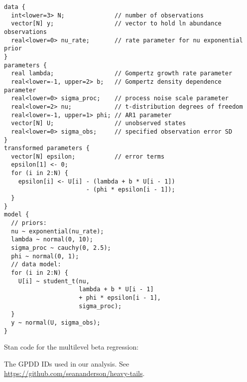 \begin{spacing}{1.15}
\begin{footnotesize}
\begin{verbatim}
data {
  int<lower=3> N;              // number of observations
  vector[N] y;                 // vector to hold ln abundance observations
  real<lower=0> nu_rate;       // rate parameter for nu exponential prior
}
parameters {
  real lambda;                 // Gompertz growth rate parameter
  real<lower=-1, upper=2> b;   // Gompertz density dependence parameter
  real<lower=0> sigma_proc;    // process noise scale parameter
  real<lower=2> nu;            // t-distribution degrees of freedom
  real<lower=-1, upper=1> phi; // AR1 parameter
  vector[N] U;                 // unobserved states
  real<lower=0> sigma_obs;     // specified observation error SD
}
transformed parameters {
  vector[N] epsilon;           // error terms
  epsilon[1] <- 0;
  for (i in 2:N) {
    epsilon[i] <- U[i] - (lambda + b * U[i - 1])
                       - (phi * epsilon[i - 1]);
  }
}
model {
  // priors:
  nu ~ exponential(nu_rate);
  lambda ~ normal(0, 10);
  sigma_proc ~ cauchy(0, 2.5);
  phi ~ normal(0, 1);
  // data model:
  for (i in 2:N) {
    U[i] ~ student_t(nu,
                     lambda + b * U[i - 1]
                     + phi * epsilon[i - 1],
                     sigma_proc);
  }
  y ~ normal(U, sigma_obs);
}
\end{verbatim}
\end{footnotesize}

\clearpage
\noindent
Stan code for the multilevel beta regression:
\begin{footnotesize}

\end{footnotesize}

\clearpage

\noindent
The GPDD IDs used in our analysis. See \url{https://github.com/seananderson/heavy-tails}.

\begin{footnotesize}
\noindent
{\tt

}
\end{footnotesize}
\end{spacing}
